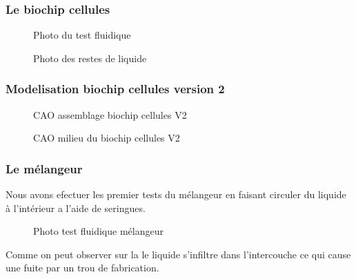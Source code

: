 \documentclass[a4paper, 11pt]{article}
\begin{document}
\subsubsection{Le biochip cellules}
\begin{multicols}{2}
    \begin{figure}[H]
        \centering
        \caption{Photo du test fluidique}
        \label{fig: fluide_cellules}
    \end{figure}
    \begin{figure}[H]
        \centering
        \caption{Photo des restes de liquide}
        \label{fig:reste_cellules}
    \end{figure}
\end{multicols}
\subsubsection{Modelisation biochip cellules version 2}
\begin{multicols}{2}
    \begin{figure}[H]
        \centering
        \caption{CAO assemblage biochip cellules V2}
        \label{fig: CAO_cellulesV2}
    \end{figure}
    \begin{figure}[H]
        \centering
        \caption{CAO milieu du biochip cellules V2}
        \label{fig:milieu_cellulesV2}
    \end{figure}
\end{multicols}
\subsubsection{Le mélangeur}
Nous avons efectuer les premier tests du mélangeur en faisant circuler du liquide à l'intérieur
a l'aide de seringues.
\begin{figure}[H]
    \centering
    \caption{Photo test fluidique mélangeur}
    \label{fig:fuite_melangeurV1}
\end{figure}
Comme on peut observer sur la \label{fig:fuite_melangeur} le liquide s'infiltre dans l'intercouche ce qui cause une fuite 
par un trou de fabrication. 
\end{document}
